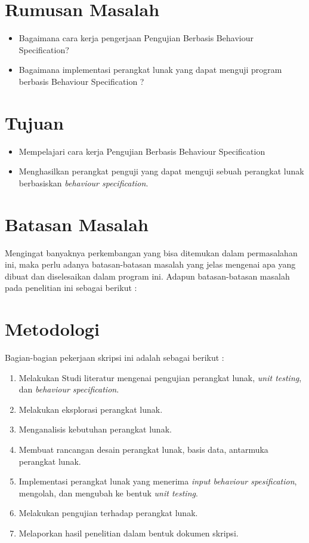 \section{Rumusan Masalah}
\label{sec:rumusan}
\begin{itemize}
\item Bagaimana cara kerja pengerjaan Pengujian Berbasis Behaviour Specification?
\item Bagaimana implementasi perangkat lunak yang dapat menguji program berbasis Behaviour Specification ?	
\end{itemize}

\section{Tujuan}
\label{sec:tujuan}
\begin{itemize}
\item Mempelajari cara kerja Pengujian Berbasis Behaviour Specification
\item Menghasilkan perangkat penguji yang dapat menguji sebuah perangkat lunak berbasiskan \textit{behaviour specification}.
\end{itemize}

\section{Batasan Masalah}
\label{sec:batasan}
Mengingat banyaknya perkembangan yang bisa ditemukan dalam permasalahan ini, maka perlu adanya batasan-batasan masalah yang jelas mengenai apa yang dibuat dan diselesaikan dalam program ini. Adapun batasan-batasan masalah pada penelitian ini sebagai berikut :

\section{Metodologi}
\label{sec:metlit}
Bagian-bagian pekerjaan skripsi ini adalah sebagai berikut :
\begin{enumerate}
\item Melakukan Studi literatur mengenai pengujian perangkat lunak, \textit{unit testing}, dan \textit{behaviour specification}.
\item Melakukan eksplorasi perangkat lunak.
\item Menganalisis kebutuhan perangkat lunak.
\item Membuat rancangan desain perangkat lunak, basis data, antarmuka perangkat lunak.
\item Implementasi perangkat lunak yang menerima \textit{input behaviour spesification}, mengolah, dan mengubah ke bentuk \textit{unit testing}.
\item Melakukan pengujian terhadap perangkat lunak.
\item Melaporkan hasil penelitian dalam bentuk dokumen skripsi.
\end{enumerate}

